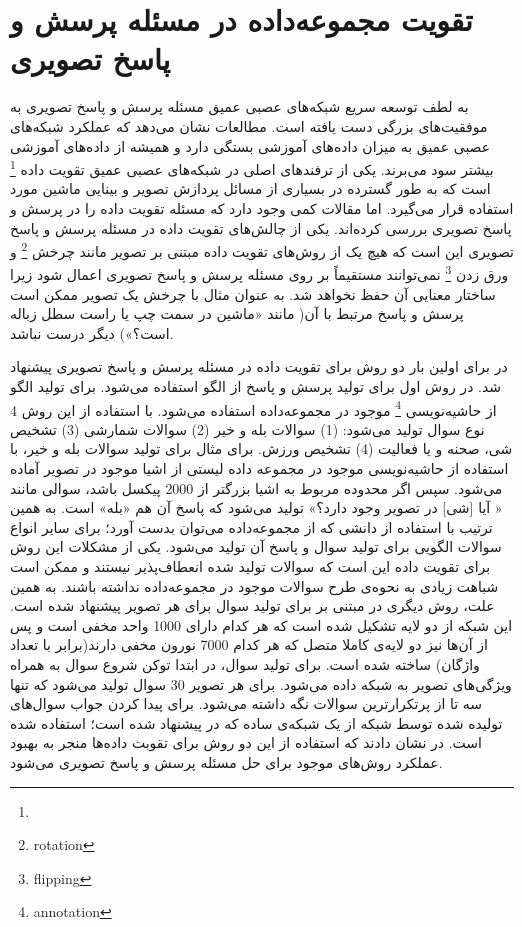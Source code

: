 \section{تقویت مجموعه‌داده در مسئله پرسش و پاسخ تصویری}
به لطف توسعه سریع شبکه‌های عصبی عمیق مسئله پرسش و پاسخ تصویری به موفقیت‌های بزرگی دست یافته است. مطالعات نشان می‌دهد که عملکرد شبکه‌های عصبی عمیق به میزان داده‌های آموزشی بستگی دارد و همیشه از داده‌های آموزشی بیشتر سود می‌برند. یکی از ترفندهای اصلی در شبکه‌های عصبی عمیق تقویت داده
\footnote{}
 است که به طور گسترده در بسیاری از مسائل پردازش تصویر و بینایی ماشین مورد استفاده قرار می‌گیرد. اما مقالات کمی وجود دارد که مسئله تقویت داده را در پرسش و پاسخ تصویری بررسی کرده‌اند. یکی از چالش‌های تقویت داده در مسئله پرسش و پاسخ تصویری این است که هیچ یک از روش‌های تقویت داده مبتنی بر تصویر مانند چرخش
 \footnote{rotation}
 و ورق زدن
 \footnote{flipping}
  نمی‌توانند مستقیماً بر روی مسئله پرسش و پاسخ تصویری اعمال شود زیرا ساختار معنایی آن حفظ نخواهد شد. به عنوان مثال با چرخش یک تصویر ممکن است پرسش و پاسخ مرتبط با آن( مانند «ماشین در سمت چپ یا راست سطل زباله است؟») دیگر درست نباشد.
  
  در
  \cite{kafle2017data}
 برای اولین بار دو روش برای تقویت داده در مسئله پرسش و پاسخ تصویری پیشنهاد شد.  در روش اول برای تولید پرسش و پاسخ از الگو استفاده‌ می‌شود. برای تولید الگو از حاشیه‌نویسی 
 \footnote{annotation}
 موجود در مجموعه‌داده استفاده‌ می‌شود. با استفاده از این روش 4 نوع سوال تولید می‌شود: (1) سوالات بله و خیر (2) سوالات شمارشی (3) تشخیص شی، صحنه و یا فعالیت (4) تشخیص ورزش. برای مثال برای تولید سوالات بله و خیر، با استفاده از حاشیه‌نویسی موجود در مجموعه ‌داده لیستی از اشیا موجود در تصویر آماده می‌شود. سپس اگر محدوده مربوط به اشیا بزرگتر از 2000 پیکسل باشد، سوالی مانند « آیا [شی] در تصویر وجود دارد؟» تولید می‌شود که پاسخ آن هم «بله» است. به همین ترتیب با استفاده از دانشی که از مجموعه‌داده می‌توان بدست آورد؛ برای سایر انواع سوالات الگویی برای تولید سوال و پاسخ آن تولید می‌شود. یکی از مشکلات این روش برای تقویت داده این است که سوالات تولید شده انعطاف‌‌پذیر نیستند و ممکن است شباهت زیادی به نحوه‌ی طرح سوالات موجود در مجموعه‌داده نداشته باشند. به همین علت، روش دیگری در 
 \cite{kafle2017data}
 مبتنی بر 
 برای تولید سوال برای هر تصویر پیشنهاد شده است. این شبکه از دو لایه 
 تشکیل شده است که هر کدام دارای 1000 واحد مخفی است و پس از آن‌ها نیز دو لایه‌ی کاملا متصل که هر کدام 7000 نورون مخفی دارند(برابر با تعداد واژگان) ساخته شده است. برای تولید سوال، در ابتدا توکن شروع سوال به همراه ویژگی‌های تصویر به شبکه داده‌ می‌شود. برای هر تصویر 30 سوال تولید می‌شود که تنها سه تا از پرتکرارترین سوالات  نگه داشته می‌شود. برای پیدا کردن جواب سوال‌های تولیده شده توسط شبکه 
 از یک شبکه‌ی ساده
 که در 
 \cite{kafle2016answer}
  پیشنهاد شده است؛ استفاده شده است. در 
 \cite{kafle2017data}
  نشان دادند که استفاده از این دو روش برای تقوبت داده‌ها منجر به بهبود عملکرد روش‌های موجود برای حل مسئله پرسش و پاسخ تصویری می‌شود. 
  
